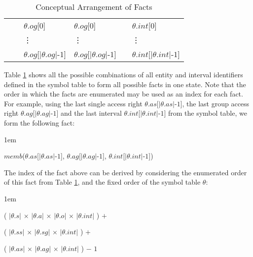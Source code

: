 \documentclass[11pt]{report}
\newenvironment{vquote}
{
  \begin{list}{}{\leftmargin 1em}\item[]
}
{
  \end{list}
}
\begin{document}
\begin{table}[tbhp]
\begin{center}
\begin{tabular}[t]{|l|l|l|l|l|l|}
{              } &
              &
              $\theta$.$og$[$0$] &
              $\theta$.$og$[$0$] &
              &
              $\theta$.$int$[$0$] \\
              &
              &
              \hspace{1em}\vdots &
              \hspace{1em}\vdots &
              &
              \hspace{1em}\vdots \\
              &
              &
              $\theta$.$og$[$|\theta$.$og|$-$1$] &
              $\theta$.$og$[$|\theta$.$og|$-$1$] &
              &
              $\theta$.$int$[$|\theta$.$int|$-$1$] \\
              \hline
            \end{tabular}
          \end{center}
          \caption{Conceptual Arrangement of Facts}
          \label{tabl-impln-ftabl}
        \end{table}

        Table \ref{tabl-impln-ftabl} shows all the possible combinations of
        all entity and interval identifiers defined in the symbol table to
        form all possible facts in one state. Note that the order in which
        the facts are enumerated may be used as an index for each fact. For
        example, using the last single access right
        $\theta$.$as$[$|$$\theta$.$as$$|$-$1$], the last group access
        right $\theta$.$ag$[$|$$\theta$.$ag$$|$-$1$] and the last interval
        $\theta$.$int$[$|$$\theta$.$int$$|$-$1$] from the symbol table,
        we form the following fact:

        \begin{vquote}
          $memb$($\theta$.$as$[$|$$\theta$.$as$$|$-$1$],
            $\theta$.$ag$[$|$$\theta$.$ag$$|$-$1$],
            $\theta$.$int$[$|$$\theta$.$int$$|$-$1$])
        \end{vquote}

        \noindent
        The index of the fact above can be derived by considering the
        enumerated order of this fact from Table \ref{tabl-impln-ftabl},
        and the fixed order of the symbol table $\theta$:

        \begin{vquote}
          (
            $|$$\theta$.$s$$|$ $\times$
            $|$$\theta$.$a$$|$ $\times$
            $|$$\theta$.$o$$|$ $\times$
            $|$$\theta$.$int$$|$
          ) $+$

          (
            $|$$\theta$.$ss$$|$ $\times$
            $|$$\theta$.$sg$$|$ $\times$
            $|$$\theta$.$int$$|$
          ) $+$

          (
            $|$$\theta$.$as$$|$ $\times$
            $|$$\theta$.$ag$$|$ $\times$
            $|$$\theta$.$int$$|$
          ) $-$ $1$
        \end{vquote}
\end{document}
